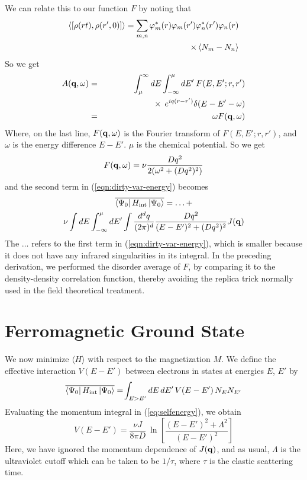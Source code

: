 \documentclass[prb,twocolumn]{revtex4}
\begin{document}
We can relate this to our function $F$ by noting that
\begin{eqnarray}
\left\langle[\rho(rt),\rho(r',0)]\right\rangle=
\sum_{m,n}\varphi^{*}_{m}(r)\varphi_{m}(r')\varphi^{*}_{n}(r')\varphi_{n}(r)\cr
\times \left\langle N_{m}-N_{n} \right\rangle
\end{eqnarray}
So we get
\begin{eqnarray}
A({\bf q},\omega) &=& \int_{\mu}^{\infty}dE\int_{-\infty}^{\mu}dE' \: F(E,E';r,r')\cr
& & {\hskip 2 cm} \times\: e^{iq(r-r')}\delta(E-E'-\omega)\cr
&=& \omega F({\bf q},\omega)
\end{eqnarray}
Where, on the last line, $F({\bf q},\omega)$ is the Fourier transform of
$F(E,E';r,r')$, and $\omega$ is the energy difference $E-E'$. $\mu$ is
the chemical potential. So we get
\begin{equation} \label{eq:F}
F({\bf q},\omega)=\nu\frac{Dq^2}{2(\omega^2+(Dq^2)^2)}
\end{equation}
and the second term in (\ref{eqn:dirty-var-energy}) becomes
\begin{multline}
\label{eq:selfenergy}
\overline{\left\langle{\Psi_0}\right| H_{\rm int} \left|{\Psi_0}\right\rangle} = \ldots +\\
\nu\int dE \int^{\mu}_{-\infty}dE' \int
\frac{d^dq}{(2\pi)^d} \frac{Dq^2}{(E-E')^2+(Dq^2)^2}J({\bf q})
\end{multline}
The $\ldots$ refers to the first term in (\ref{eqn:dirty-var-energy}),
which is smaller because it does not have any infrared singularities in
its integral.
In the preceding derivation, we 
performed the disorder average of $F$, by comparing it to the
density-density correlation function, thereby avoiding
the replica trick normally used in the field theoretical treatment.


\section{Ferromagnetic Ground State}

We now minimize $\langle H\rangle$ with respect to the
magnetization $M$. We define the effective interaction
$V(E-E')$ between electrons in
states at energies $E$, $E'$ by
\begin{equation}
\overline{\left\langle{\Psi_0}\right| H_{\rm int} \left|{\Psi_0}\right\rangle} =
\!\int_{E>E'} dE \,dE' \, V(E-E')\,{N_E}N_{E'}
\end{equation}
Evaluating the momentum integral in (\ref{eq:selfenergy}), we
obtain
\begin{equation}
\label{eq:selfenergy2}
V(E-E')=\frac{{\nu} J}{8\pi D}\: \ln\!\left[\frac{(E-E')^2+\Lambda^2}{(E-E')^2}\right]
\end{equation}
Here, we have ignored the momentum dependence of $J({\bf q})$,
and as usual, $\Lambda$ is the ultraviolet cutoff which can be taken to
be $1/\tau$, where $\tau$ is the elastic scattering time.
\end{document}
